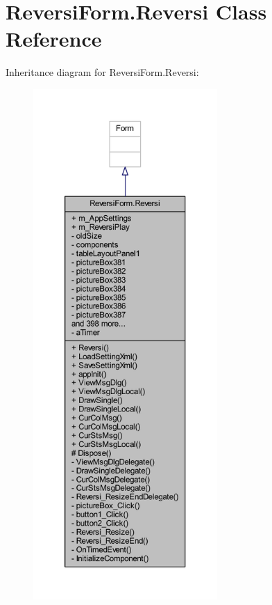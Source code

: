 \hypertarget{class_reversi_form_1_1_reversi}{}\section{Reversi\+Form.\+Reversi Class Reference}
\label{class_reversi_form_1_1_reversi}


Inheritance diagram for Reversi\+Form.\+Reversi\+:
\nopagebreak
\begin{figure}[H]
\begin{center}
\leavevmode
\includegraphics[height=550pt]{class_reversi_form_1_1_reversi__inherit__graph}
\end{center}
\end{figure}


